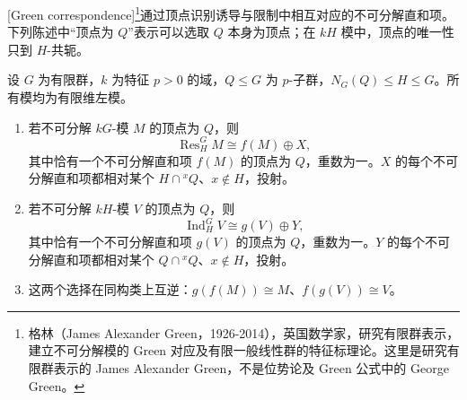[Green correspondence]\footnote{格林（James Alexander Green，1926-2014），英国数学家，研究有限群表示，建立不可分解模的 Green 对应及有限一般线性群的特征标理论。这里是研究有限群表示的 James Alexander Green，不是位势论及 Green 公式中的 George Green。}通过顶点识别诱导与限制中相互对应的不可分解直和项。下列陈述中“顶点为 \(Q\)”表示可以选取 \(Q\) 本身为顶点；在 \(kH\) 模中，顶点的唯一性只到 \(H\)-共轭。
\begin{theorem}[Green 对应]\label{b5:thm:green-correspondence}
	设 \(G\) 为有限群，\(k\) 为特征 \(p>0\) 的域，\(Q\le G\) 为 \(p\)-子群，\(N_G(Q)\le H\le G\)。所有模均为有限维左模。
	\begin{enumerate}
		\item 若不可分解 \(kG\)-模 \(M\) 的顶点为 \(Q\)，则
		\[
			\operatorname{Res}_H^G M\cong f(M)\oplus X,
		\]
		其中恰有一个不可分解直和项 \(f(M)\) 的顶点为 \(Q\)，重数为一。\(X\) 的每个不可分解直和项都相对某个 \(H\cap{}^xQ\)、\(x\notin H\)，投射。
		\item 若不可分解 \(kH\)-模 \(V\) 的顶点为 \(Q\)，则
		\[
			\operatorname{Ind}_H^G V\cong g(V)\oplus Y,
		\]
		其中恰有一个不可分解直和项 \(g(V)\) 的顶点为 \(Q\)，重数为一。\(Y\) 的每个不可分解直和项都相对某个 \(Q\cap{}^xQ\)、\(x\notin H\)，投射。
		\item 这两个选择在同构类上互逆：\(g(f(M))\cong M\)、\(f(g(V))\cong V\)。
	\end{enumerate}
\end{theorem}
